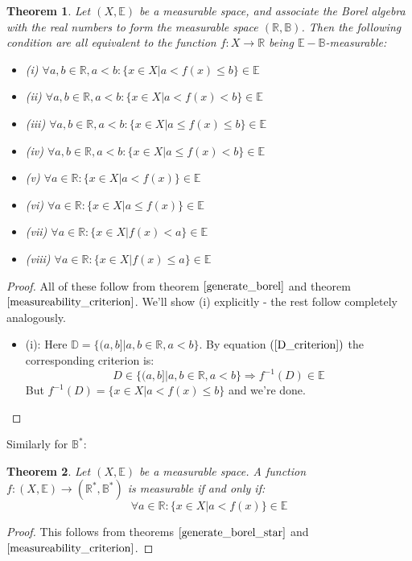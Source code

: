 \documentclass[12pt, a4paper]{article}
\newtheorem{theorem}{Theorem}[section]
\numberwithin{equation}{section}
\begin{document}
\begin{theorem}
\label{measurable_f}
Let $(X,\mathbb{E})$ be a measurable space, and associate the Borel algebra with the real numbers to form the measurable space $(\mathbb{R},\mathbb{B})$. Then the following condition are all equivalent to the function $f: X\rightarrow\mathbb{R}$ being $\mathbb{E}-\mathbb{B}$-measurable:
\begin{itemize}
\item (i) $\forall a,b\in\mathbb{R}, a<b: \{x\in X|a<f(x)\le b\}\in\mathbb{E}$
\item (ii) $\forall a,b\in\mathbb{R}, a<b: \{x\in X|a<f(x)<b\}\in\mathbb{E}$
\item (iii) $\forall a,b\in\mathbb{R}, a<b: \{x\in X|a\le f(x)\le b\}\in\mathbb{E}$
\item (iv) $\forall a,b\in\mathbb{R}, a<b: \{x\in X|a\le f(x)<b\}\in\mathbb{E}$
\item (v) $\forall a\in\mathbb{R}: \{x\in X|a<f(x)\}\in\mathbb{E}$
\item (vi) $\forall a\in\mathbb{R}: \{x\in X|a\le f(x)\}\in\mathbb{E}$
\item (vii) $\forall a\in\mathbb{R}: \{x\in X|f(x)<a\}\in\mathbb{E}$
\item (viii) $\forall a\in\mathbb{R}: \{x\in X|f(x)\le a\}\in\mathbb{E}$
\end{itemize}
\end{theorem}
\begin{proof}
All of these follow from theorem $\ref{generate_borel}$ and theorem $\ref{measureability_criterion}$. We'll show (i) explicitly - the rest follow completely analogously.
\begin{itemize}
\item (i): Here $\mathbb{D}=\{(a,b]|a,b\in\mathbb{R}, a<b\}$. By equation $(\ref{D_criterion})$ the corresponding criterion is:
\begin{equation}
D\in\{(a,b]|a,b\in\mathbb{R}, a<b\}\Rightarrow f^{-1}(D)\in\mathbb{E}
\end{equation}
But $f^{-1}(D)=\{x\in X|a<f(x)\le b\}$ and we're done.
\end{itemize}
\end{proof}

Similarly for $\mathbb{B}^*$:

\begin{theorem}
\label{measurable_f_star}
Let $(X,\mathbb{E})$ be a measurable space. A function $f: (X,\mathbb{E})\rightarrow(\mathbb{R}^*,\mathbb{B}^*)$ is measurable if and only if:
\begin{equation}
\forall a\in\mathbb{R}: \{x\in X|a<f(x)\}\in\mathbb{E}
\end{equation}
\end{theorem}
\begin{proof}
This follows from theorems $\ref{generate_borel_star}$ and $\ref{measureability_criterion}$.
\end{proof}
\end{document}
